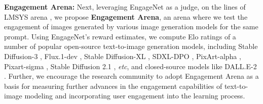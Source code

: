  \textbf{Engagement Arena:} Next, leveraging EngageNet as a judge, on the lines of LMSYS arena \cite{zheng2024judging,chiang2024chatbotarenaopenplatform}, we propose \textbf{Engagement Arena}, an arena where we test the engagement of images generated by various image generation models for the same prompt. Using EngageNet's reward estimates, we compute Elo ratings of a number of popular open-source text-to-image generation models, including Stable Diffusion-3 \cite{esser2024scaling}, Flux.1-dev \cite{blackforestlabs2024}, Stable Diffusion-XL \cite{podell2023sdxl}, SDXL-DPO \cite{wallace2024diffusion}, PixArt-alpha \cite{chen2024pixartalpha}, Pixart-sigma \cite{chen2024pixart}, Stable Diffusion 2.1 \cite{rombach2022high}, \textit{etc}, and closed-source models like DALL.E-2 \cite{ramesh2022hierarchical}. Further, we encourage the research community to adopt Engagement Arena as a basis for measuring further advances in the engagement capabilities of text-to-image modeling and incorporating user engagement into the learning process. 
 
 
 
 
 
 
